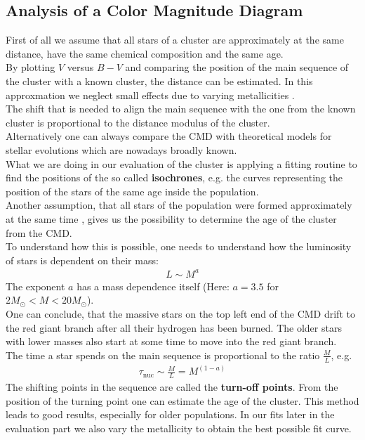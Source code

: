 \subsection{Analysis of a Color Magnitude Diagram}
First of all we assume that all stars of a cluster are approximately at the same distance, have the same chemical composition and the same age. \\
By plotting $V$ versus $B-V$ and comparing the position of the main sequence of the cluster with a known cluster, the distance can be estimated. In this approxmation we neglect small effects due to varying metallicities . \\
The shift that is needed to align the main sequence with the one from the known cluster is proportional to the distance modulus of the cluster. \\
Alternatively one can always compare the CMD with theoretical models for stellar evolutions which are nowadays broadly known. \\
What we are doing in our evaluation of the cluster is applying a fitting routine to find the positions of the so called \textbf{isochrones}, e.g. the curves representing the position of the stars of the same age inside the population. \\
Another assumption, that all stars of the population were  formed approximately at the same time , gives us the possibility to determine the age of the cluster from the CMD. \\
To understand how this is possible, one needs to understand how the luminosity of stars is dependent on their mass:
\begin{align}
	L \sim M^a
\end{align}
 The exponent $a$ has a mass dependence itself (Here: $a = 3.5 $ for $2M_{\odot} < M < 20M_{\odot}$). \\ One can conclude, that the massive stars on the top left end of the CMD drift to the red giant branch after all their hydrogen has been burned. The older stars with lower masses also start at some time to move into the red giant branch. \\
 The time a star spends on the main sequence is proportional to the ratio $\frac{M}{L}$, e.g.
 \begin{align}
 	\tau_{\text{nuc}} \sim \frac{M}{L} = M^{(1-a)}
 \end{align}
 The shifting points in the sequence are called the \textbf{turn-off points}. From the position of the turning point one can estimate the age of the cluster. This method leads to good results, especially for older populations. In our fits later in the evaluation part we also vary the metallicity to obtain the best possible fit curve. 

